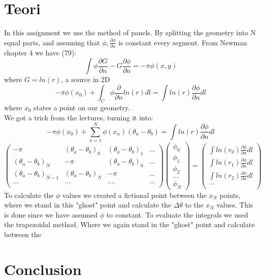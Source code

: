 \documentclass[a4paper,norsk]{article}
\begin{document}
\section{Teori}
In this assignment we use the method of panels. By splitting the geometry into N equal parts, and assuming that $\phi , \frac{\partial \phi }{\partial n}$ is constant every segment.
From Newman chapter 4 we have (79):
\[   \int \phi \frac{\partial G }{\partial n} - G\frac{\partial \phi }{\partial n} = -\pi \phi(x,y) \]
where $G = ln (r)$, a source in 2D
$$ -\pi \phi(x_0) + \int_C \phi \frac{\partial }{\partial n} ln(r) dl = \int ln(r) \frac{\partial \phi}{\partial n} dl       $$
where $x_0$ states a point on our geometry.\\
\newline
We got a trick from the lectures, turning it into:
\[ -\pi \phi(x_0) + \sum_{n=1}^N \phi(x_n) (\theta_a - \theta_b)  = \int ln(r)\frac{\partial \phi }{\partial n} dl    \]
$$
\begin{pmatrix}
  -\pi & (\theta_a - \theta_b)_0  & (\theta_a - \theta_b)_1 & ...\\
  (\theta_a - \theta_b)_N  & -\pi & (\theta_a - \theta_b)_0  & ...\\
  (\theta_a - \theta_b)_{N-1}  & (\theta_a - \theta_b)_N  & -\pi & ...\\
  ... & ... & ....& ...  \\
 \end{pmatrix}
 \begin{pmatrix}
\phi_0  \\
\phi_1 \\
\phi_2 \\ 
  ...  \\
  \phi_N
 \end{pmatrix}
 =
 \begin{pmatrix}
\int ln(r_0)\frac{\partial \phi }{\partial n} dl   \\
\int ln(r_1)\frac{\partial \phi }{\partial n} dl  \\
\int ln(r_2)\frac{\partial \phi }{\partial n} dl  \\ 
  ...  \\
  \end{pmatrix}
  $$
To calculate the $\phi$ values we created a fictional point between the $x_N$ points, where we stand in this "ghost" point and calculate the $\Delta \theta$ to the $x_N$ values. This is done since we have assumed $\phi$ to constant.
To evaluate the integrals we used the trapezoidal method. Where we again stand in the "ghost" point and calculate between the 





\section{Conclusion}
\end{document}
